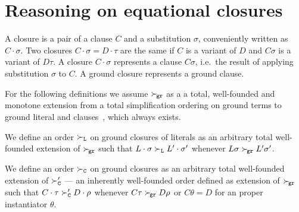 \section{Reasoning on equational closures}\label{sec:reasoning:on:equational:closures}

\begin{definition}
    A closure is a pair of a clause \( C \) and a substitution \( \sigma \),
    conveniently written as \( C\cdot\sigma \). Two closures \( C\cdot\sigma = D\cdot\tau \)
    are the same if \( C \) is a variant of \( D \) and \( C\sigma \) is a variant of \( D\tau \).
    A closure \( C\cdot\sigma \) represents a clause \( C\sigma \),
    i.e.~the result of applying substitution \( \sigma \) to \( C \).
    A ground closure represents a ground clause.
\end{definition}

For the following definitions we assume
\( \mathrel\succ_{\!\mathtt{gr}} \) as a a total, well-founded and monotone extension
from a total simplification ordering on ground terms
to ground literal and clauses~\cite{NR2001},
which always exists.


\begin{definition}
    We define an order \( \mathrel\succ_{\mathtt{L}} \) on ground closures of literals
    as an arbitrary total well-founded extension of \( \mathrel\succ_{\!\mathtt{gr}} \)
    such that
    \( L\cdot\sigma\mathrel\succ_{\mathtt{L}} L'\cdot\sigma' \) whenever
    \( L\sigma\mathrel\succ_{\!\mathtt{gr}} L'\sigma' \).

    We define an order \( \mathrel\succ_{\mathtt{C}} \) on ground closures
    as an arbitrary total well-founded extension of
    \( \mathrel\succ_{\mathtt{C}}' \) --- an inherently well-founded order defined as extension of \( \mathrel\succ_{\!\mathtt{gr}} \)
    such that
    \( C\cdot\tau\mathrel\succ_{\mathtt{C}}' D\cdot\rho \) whenever
    \( C\tau\mathrel\succ_{\!\mathtt{gr}} D\rho \) or \( C\theta = D \) for an proper instantiator \( \theta \).
\end{definition}

